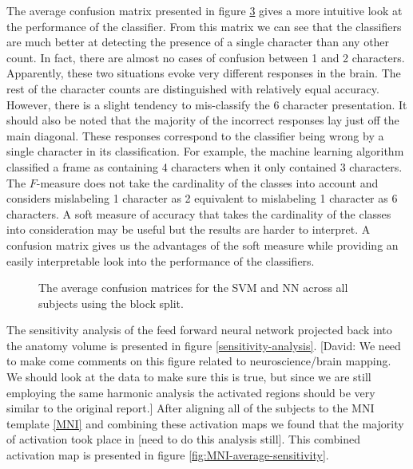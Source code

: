 \documentclass[preprint,authoryear,12pt]{elsarticle}
\begin{document}
The average confusion matrix presented in figure \ref{fig:average-confusion} gives a more intuitive look at the performance of the classifier.
From this matrix we can see that the classifiers are much better at detecting the presence of a single character than any other count.
In fact, there are almost no cases of confusion between 1 and 2 characters.
Apparently, these two situations evoke very different responses in the brain.
The rest of the character counts are distinguished with relatively equal accuracy.
However, there is a slight tendency to mis-classify the 6 character presentation.
It should also be noted that the majority of the incorrect responses lay just off the main diagonal.
These responses correspond to the classifier being wrong by a single character in its classification.
For example, the machine learning algorithm classified a frame as containing 4 characters when it only contained 3 characters.
The $F$-measure does not take the cardinality of the classes into account and considers mislabeling 1 character as 2 equivalent to mislabeling 1 character as 6 characters.
A soft measure of accuracy that takes the cardinality of the classes into consideration may be useful but the results are harder to interpret.
A confusion matrix gives us the advantages of the soft measure while providing an easily interpretable look into the performance of the classifiers.

\begin{figure}
\centering
\begin{subfigure}{\textwidth}
\centering

\caption{}
\label{fig:average-confusion-svm}
\end{subfigure}
\begin{subfigure}{\textwidth}
\centering

\caption{}
\label{fig:average-confusion-nn}
\end{subfigure}
\caption{The average confusion matrices for the  SVM and  NN across all subjects using the block split.}
\label{fig:average-confusion}
\end{figure}

The sensitivity analysis of the feed forward neural network projected back into the anatomy volume is presented in figure \ref{sensitivity-analysis}.
[David: We need to make come comments on this figure related to neuroscience/brain mapping. We should look at the data to make sure this is true, but since we are still employing the same harmonic analysis the activated regions should be very similar to the original report.]
After aligning all of the subjects to the MNI template \ref{MNI} and combining these activation maps we found that the majority of activation took place in [need to do this analysis still].
This combined activation map is presented in figure \ref{fig:MNI-average-sensitivity}.
\end{document}
